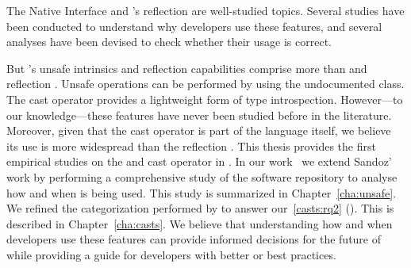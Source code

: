 The \java{} Native Interface and \java{}'s reflection \api{} are well-studied topics.
Several studies have been conducted to understand why developers use these features,
and several analyses have been devised to check whether their usage is correct.

But \java{}'s unsafe intrinsics and reflection capabilities comprise more than \jni{} and reflection \api{}.
Unsafe operations can be performed by using the undocumented \smu{} class.
The cast operator provides a lightweight form of type introspection.
However---to our knowledge---these features have never been studied before in the literature.
Moreover,
given that the cast operator is part of the \java{} language itself,
we believe its use is more widespread than the reflection \api{}.
This thesis provides the first empirical studies on the \unsafe{} \api{} and cast operator in \java{}.
In our work~\citep{mastrangeloUseYourOwn2015} we extend Sandoz' work
by performing a comprehensive study of the \mavencentral{}
software repository to analyse how and when \smu{} is being used.
This study is summarized in Chapter~\ref{cha:unsafe}.
We refined the categorization performed by \cite{wintherGuardedTypePromotion2011} to answer our~\ref{casts:rq2} (\emph{\crqB}).
This is described in Chapter~\ref{cha:casts}.
We believe that understanding how and when developers use these features can provide informed decisions for the future of \java{} while providing a guide for developers with better or best practices.
